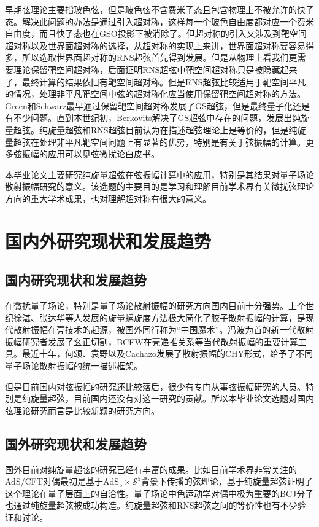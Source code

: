 \documentclass[type = bachelor]{whu-proposal}  %
\begin{document}
早期弦理论主要指玻色弦，但是玻色弦不含费米子态且包含物理上不被允许的快子态。解决此问题的办法是通过引入超对称，这样每一个玻色自由度都对应一个费米自由度，而且快子态也在GSO投影下被消除了\cite{Polchinski:1998rr}。但超对称的引入又涉及到靶空间超对称以及世界面超对称的选择，从超对称的实现上来讲，世界面超对称要容易得多，所以选取世界面超对称的RNS超弦首先得到发展。但是从物理上看我们更需要理论保留靶空间超对称，后面证明RNS超弦中靶空间超对称只是被隐藏起来了，最终计算的结果依旧有靶空间超对称。但是RNS超弦比较适用于靶空间平凡的情况，处理非平凡靶空间中弦的超对称化应当使用保留靶空间超对称的方法。Green和Schwarz最早通过保留靶空间超对称发展了GS超弦，但是最终量子化还是有不少问题。直到本世纪初，Berkovits解决了GS超弦中存在的问题，发展出纯旋量超弦\cite{Berkovits:2000fe}。纯旋量超弦和RNS超弦目前认为在描述超弦理论上是等价的，但是纯旋量超弦在处理非平凡靶空间问题上有显著的优势，特别是有关于弦振幅的计算。更多弦振幅的应用可以见弦微扰论白皮书\cite{berkovits2022snowmasswhitepaperstring}。

本毕业论文主要研究纯旋量超弦在弦振幅计算中的应用，特别是其结果对量子场论散射振幅研究的意义。该选题的主要目的是学习和理解目前学术界有关微扰弦理论方向的重大学术成果，也对理解超对称有很大的意义。

\section{国内外研究现状和发展趋势}
\subsection{国内研究现状和发展趋势}
在微扰量子场论，特别是量子场论散射振幅的研究方向国内目前十分强势。上个世纪徐湛、张达华等人发展的旋量螺旋度方法极大简化了胶子散射振幅的计算，是现代散射振幅在壳技术的起源，被国外同行称为“中国魔术”\cite{Xu:1986xb}。冯波为首的新一代散射振幅研究者发展了幺正切割，BCFW在壳递推关系等当代散射振幅的重要计算工具\cite{Britto:2005fq,Britto:2004ap,Britto:2004nc}。最近十年，何颂、袁野以及Cachazo发展了散射振幅的CHY形式，给予了不同量子场论散射振幅的统一描述框架\cite{Cachazo:2013hca,Cachazo:2013iea}。

但是目前国内对弦振幅的研究还比较落后，很少有专门从事弦振幅研究的人员。特别是纯旋量超弦，目前国内还没有对这一研究的贡献。所以本毕业论文选题对国内弦理论研究而言是比较新颖的研究方向。

\subsection{国外研究现状和发展趋势}
国外目前对纯旋量超弦的研究已经有丰富的成果。比如目前学术界非常关注的AdS/CFT对偶最初是基于$\mathrm{AdS}_5\times \mathcal{S}^5$背景下传播的弦理论，基于纯旋量超弦证明了这个理论在量子层面上的自洽性\cite{Berkovits:2004xu}。量子场论中色运动学对偶中极为重要的BCJ分子也通过纯旋量超弦被成功构造\cite{Mafra:2011kj}。纯旋量超弦和RNS超弦之间的等价性也有不少验证和讨论\cite{Berkovits:2005ng,Berkovits:2024ono}。
\end{document}

